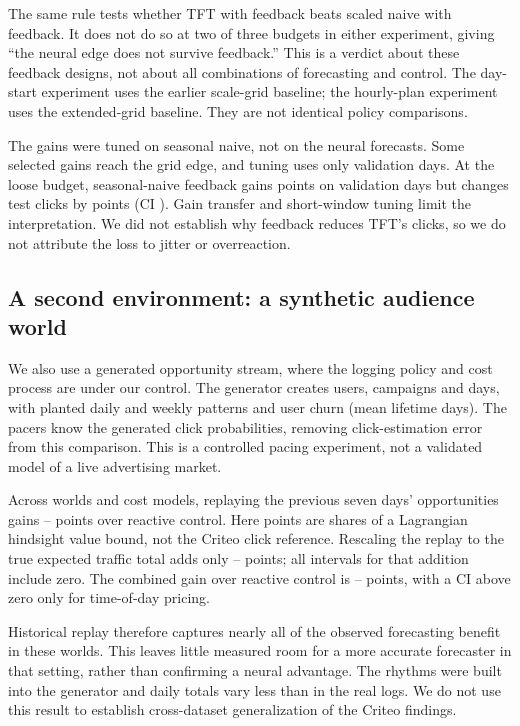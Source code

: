\documentclass[sigconf,nonacm]{acmart}
\begin{document}
The same rule tests whether TFT with feedback beats scaled naive with
feedback. It does not do so at two of three budgets in either experiment,
giving ``the neural edge does not survive feedback.'' This is a verdict about
these feedback designs, not about all combinations of forecasting and control.
The day-start experiment uses the earlier scale-grid baseline; the hourly-plan
experiment uses the extended-grid baseline. They are not identical policy
comparisons.

The gains were tuned on seasonal naive, not on the neural forecasts. Some
selected gains reach the grid edge, and tuning uses only
 validation days. At the loose budget, seasonal-naive
feedback gains  points on validation days but changes
test clicks by  points (CI
). Gain transfer and short-window tuning limit the
interpretation. We did not establish why feedback reduces TFT's clicks, so
we do not attribute the loss to jitter or overreaction.

\subsection{A second environment: a synthetic audience world}\label{sec:world}
We also use a generated opportunity stream, where the logging policy and
cost process are under our control. The generator creates  users,
 campaigns and  days, with planted daily and weekly
patterns and user churn (mean lifetime  days). The pacers know
the generated click probabilities, removing click-estimation error from this
comparison. This is a controlled pacing experiment, not a validated model
of a live advertising market.

Across  worlds and  cost models, replaying the previous
seven days' opportunities gains --
points over reactive control. Here points are shares of a Lagrangian hindsight
value bound, not the Criteo click reference. Rescaling the replay to the true
expected traffic total adds only -- points;
all intervals for that addition include zero. The combined gain over reactive
control is -- points, with a CI above zero
only for time-of-day pricing.

Historical replay therefore captures nearly all of the observed forecasting
benefit in these worlds. This leaves little measured room for a more accurate
forecaster in that setting, rather than confirming a neural advantage.
The rhythms were built into the generator and daily totals vary less than in
the real logs. We do not use this result to establish cross-dataset
generalization of the Criteo findings.
\end{document}
